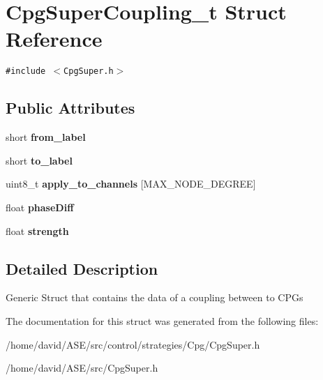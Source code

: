 \hypertarget{structCpgSuperCoupling__t}{
\section{CpgSuperCoupling\_\-t Struct Reference}
\label{structCpgSuperCoupling__t}
}
{\tt \#include $<$CpgSuper.h$>$}

\subsection*{Public Attributes}
\begin{CompactItemize}
\item 
\hypertarget{structCpgSuperCoupling__t_e67bc9f3cbd6b1bb3c5fe494a143e42b}{
short \textbf{from\_\-label}}
\label{structCpgSuperCoupling__t_e67bc9f3cbd6b1bb3c5fe494a143e42b}

\item 
\hypertarget{structCpgSuperCoupling__t_8731aa2207e8ba9cf8b4b7e1d00912fb}{
short \textbf{to\_\-label}}
\label{structCpgSuperCoupling__t_8731aa2207e8ba9cf8b4b7e1d00912fb}

\item 
\hypertarget{structCpgSuperCoupling__t_b6e3169747698cab2d126c6194625e9f}{
uint8\_\-t \textbf{apply\_\-to\_\-channels} \mbox{[}MAX\_\-NODE\_\-DEGREE\mbox{]}}
\label{structCpgSuperCoupling__t_b6e3169747698cab2d126c6194625e9f}

\item 
\hypertarget{structCpgSuperCoupling__t_f7d6dec129cf26f4e583041db5fc4528}{
float \textbf{phaseDiff}}
\label{structCpgSuperCoupling__t_f7d6dec129cf26f4e583041db5fc4528}

\item 
\hypertarget{structCpgSuperCoupling__t_5f139f169150ab7313b6e4aff980aee2}{
float \textbf{strength}}
\label{structCpgSuperCoupling__t_5f139f169150ab7313b6e4aff980aee2}

\end{CompactItemize}


\subsection{Detailed Description}
Generic Struct that contains the data of a coupling between to CPGs 

The documentation for this struct was generated from the following files:\begin{CompactItemize}
\item 
/home/david/ASE/src/control/strategies/Cpg/CpgSuper.h\item 
/home/david/ASE/src/CpgSuper.h\end{CompactItemize}
